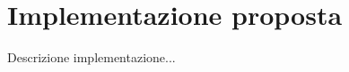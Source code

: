 \chapter{Implementazione proposta}
\label{chap:implementazione}
\vspace{1cm}
Descrizione implementazione...